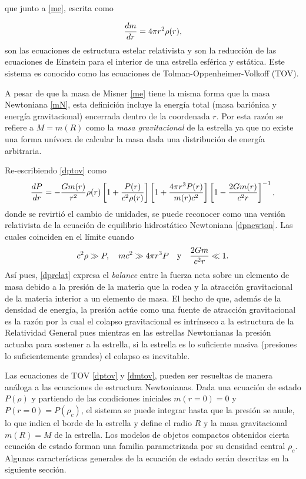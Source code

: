 que junto a \eqref{me}, escrita como

\begin{equation}
    \dv{m}{r} = 4 \pi r ^ { 2 } \rho(r),
    \label{dmtov}
\end{equation}
son las ecuaciones de estructura estelar relativista y son la reducción de las ecuaciones de Einstein para el interior de una estrella esférica y estática. Este sistema es conocido como las ecuaciones de Tolman-Oppenheimer-Volkoff (TOV).

A pesar de que la masa de Misner \eqref{me} tiene la misma forma que la masa Newtoniana \eqref{mN}, esta definición incluye la energía total (masa bariónica y energía gravitacional) encerrada dentro de la coordenada $r$. Por esta razón se refiere a $M=m(R)$ como la \emph{masa gravitacional} de la estrella ya que no existe una forma unívoca de calcular la masa dada una distribución de energía arbitraria. 

Re-escribiendo \eqref{dptov} como
\begin{equation}
    \dv{P}{r} =  - \frac { G  m ( r ) } { r ^ { 2 } } \rho ( r ) \left[ 1 + \frac { P ( r ) } {c ^ { 2 } \rho ( r ) } \right] \left[ 1 + \frac { 4 \pi r ^ { 3 } P ( r ) } { m ( r ) c ^ { 2 } } \right]  \left[ 1 - \frac { 2 G m ( r ) } { c ^ { 2 } r } \right] ^ { - 1 }, 
    \label{dprelat}
\end{equation}
donde se revirtió el cambio de unidades, se puede reconocer como una versión relativista de la ecuación de equilibrio hidrostático Newtoniana \eqref{dpnewton}. Las cuales coinciden en el límite cuando 
\begin{equation}
    c^2\rho \gg P \qc mc^2 \gg 4\pi r^3P \quad \text{y} \quad  \frac{2Gm}{c^2r}\ll 1.
\end{equation}
Así pues,  \eqref{dprelat} expresa el \textit{balance} entre la fuerza neta sobre un elemento de masa debido a la presión de la materia que la rodea y la atracción gravitacional de la materia interior a un elemento de masa. El hecho de que, además de la densidad de energía, la presión actúe como una fuente de atracción gravitacional es la razón por la cual el colapso gravitacional es intrínseco a la estructura de la Relatividad General pues mientras en las estrellas Newtonianas la presión actuaba para sostener a la estrella, si la estrella es lo suficiente masiva (presiones lo suficientemente grandes) el colapso es inevitable.

Las ecuaciones de TOV \eqref{dptov} y \eqref{dmtov}, pueden ser resueltas de manera análoga a las ecuaciones de estructura Newtonianas. Dada una ecuación de estado $P(\rho)$ y partiendo de las condiciones iniciales $m(r=0)=0$ y $P(r=0)=P(\rho_c)$, el sistema se puede integrar hasta que la presión se anule, lo que indica el borde de la estrella y define el radio $R$ y la masa gravitacional $m(R)=M$ de la estrella. Los modelos de objetos compactos obtenidos cierta ecuación de estado forman una familia parametrizada por su densidad central $\rho_c$. Algunas características generales de la ecuación de estado serán descritas en la siguiente sección.

